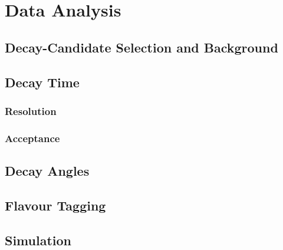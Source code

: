 \chapter{Data Analysis}
\label{chap:ana}


\section{Decay-Candidate Selection and Background}
\label{sec:ana_bkgSub}

\section{Decay Time}
\label{sec:ana_time}

\subsection{Resolution}
\label{subsec:ana_time_res}

\subsection{Acceptance}
\label{subsec:ana_time_acc}

\section{Decay Angles}
\label{sec:ana_angles}

\section{Flavour Tagging}
\label{sec:ana_tagging}

\section{Simulation}
\label{sec:ana_sim}
